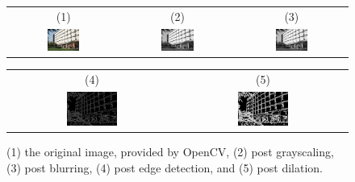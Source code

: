 \begin{figure}[H]
    \begin{center}
    \begin{tabular}{ c c c }
        (1) & (2) & (3) \\
        \includegraphics[width=0.31\textwidth]{Figures/building.jpg} &
        \includegraphics[width=0.31\textwidth]{Figures/buildGray.jpg} &
        \includegraphics[width=0.31\textwidth]{Figures/buildBlur.jpg}
    \end{tabular}
    \begin{tabular}{ c c }
        (4) & (5) \\
        \includegraphics[width=0.31\textwidth]{Figures/buildCanny.jpg} &
        \includegraphics[width=0.31\textwidth]{Figures/buildDilated.jpg}
    \end{tabular}
    \caption[Process of Edge Detection]{(1) the original image, provided by OpenCV, (2) post grayscaling, (3) post blurring, (4) post edge detection, and (5) post dilation.}
    \label{fig:CannyProc}
    \end{center}
\end{figure}

